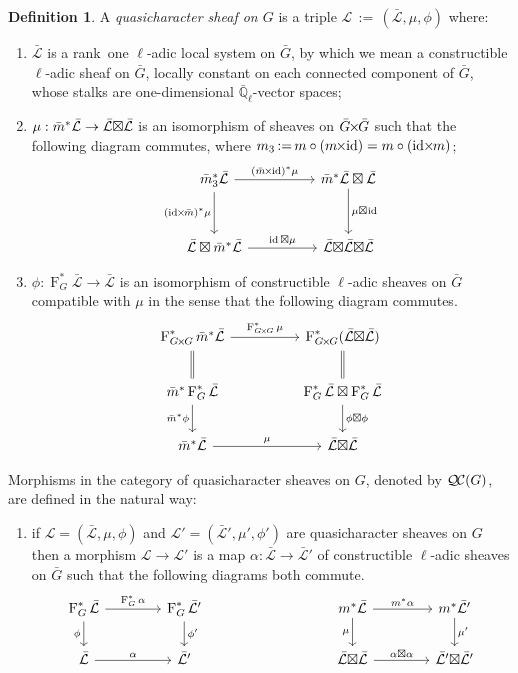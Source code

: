 \documentclass[11pt]{amsart}
\makeatletter
\theoremstyle{plain}
\theoremstyle{definition}
\newtheorem{definition}[theorem]{Definition}
\theoremstyle{remark}
\newcommand{\EE}{\mathbb{\bar Q}_\ell}
\newcommand{\Frob}[1]{\operatorname{F}_{#1}}
\DeclareMathOperator{\id}{id}
\newcommand{\ceq}{{\, :=\, }}
\newcommand{\qcs}[1]{{\mathcal{#1}}}
\newcommand{\gqcs}[1]{{\mathcal{\bar #1}}}
\newcommand{\QC}{{\mathcal{Q\hskip-0.8pt C}}}
\newcommand{\labitem}[2]{%
\def\@itemlabel{\textbf{#1}}
\item
\def\@currentlabel{#1}\label{#2}}
\newcommand{\bm}{\bar{m}}
\newcommand{\bG}{\bar{G}}
\newcommand{\tight}[3]{\hspace{-#1pt}{#2}\hspace{-#3pt}}
\newcommand{\bGxG}{\text{$\bar{G} \tight{1}{\times}{1} \bar{G}$}}
\newcommand{\GxxG}{\text{$G \tight{1}{\times}{1} G$}}
\newcommand{\LxL}{\text{$\gqcs{L} \tight{0}{\boxtimes}{0} \gqcs{L}$}}
\makeatother
\begin{document}
\begin{definition}\label{def:QC}
A \emph{quasicharacter sheaf on $G$} is a triple
$\qcs{L}\ceq (\gqcs{L},\mu,\phi)$ where:
\begin{enumerate}
\labitem{(CS.0)}{CS.0} $\gqcs{L}$ is a rank~one $\ell$-adic local system on $\bG$, by which we mean
a constructible $\ell$-adic sheaf on $\bG$, locally constant on each connected component of $\bG$, whose stalks are one-dimensional $\EE$-vector spaces; 
\labitem{(CS.1)}{CS.1} $\mu: \bm^* \gqcs{L} \to \LxL$ is an isomorphism of sheaves on $\bGxG$ such that the following diagram commutes, 
  where $m_3 \ceq m\circ (m\tight{1}{\times}{2}\id) = m\circ (\id\tight{2}{\times}{1} m)$;
%
  \[
  \begin{tikzcd}[row sep=30]
  \bm_3^*\gqcs{L} \arrow{rr}{(\bm \tight{1}{\times}{2} \id)^*\mu} \arrow[swap]{d}{(\id \tight{2}{\times}{1} \bm)^*\mu}
    &&  \bm^*\gqcs{L} \boxtimes \gqcs{L} \dar{\mu \tight{0}{\boxtimes}{1} \id} \\
    \gqcs{L} \boxtimes \bm^* \gqcs{L} \arrow{rr}{\id \boxtimes \mu}
    &&  \gqcs{L} \tight{0}{\boxtimes}{0} \LxL
  \end{tikzcd}
  \]
%
\labitem{(CS.2)}{CS.2} $\phi : \Frob{G}^* \gqcs{L} \to \gqcs{L}$ is an
  isomorphism of constructible $\ell$-adic sheaves on $\bG$ compatible with $\mu$ in the sense that the following diagram commutes.
%
  \[
  \begin{tikzcd}[row sep=20]
  \Frob{\GxxG}^* \bm^* \gqcs{L} \arrow{rr}{\Frob{\GxxG}^*\mu}
    && \Frob{\GxxG}^*(\LxL)\\
    \arrow[equal]{u} \bm^*  \Frob{G}^* \gqcs{L} \arrow[swap]{d}{\bm^* \phi}
    && \Frob{G}^*\gqcs{L}\boxtimes \Frob{G}^*\gqcs{L} \dar{\phi\boxtimes \phi} \arrow[equal]{u} \\
    \bm^*\gqcs{L} \arrow{rr}{\mu}
    && \LxL
  \end{tikzcd}
  \]
\end{enumerate}
\end{definition}

Morphisms in the category of quasicharacter sheaves on $G$, denoted by $\QC(G)$, are defined in the natural way:
\begin{enumerate}
\labitem{(CS.3)}{CS.3} if $\qcs{L} = (\gqcs{L},\mu,\phi)$ and
  $\qcs{L'} = (\gqcs{L'},\mu',\phi')$ are quasicharacter sheaves on $G$ then
  a morphism $\qcs{L} \to \qcs{L}'$ is a map $\alpha : \gqcs{L} \to \gqcs{L'}$
  of constructible $\ell$-adic sheaves on $\bG$ such that the following diagrams both commute.
  \[
  \begin{tikzcd}[column sep=40]
  \Frob{G}^* \gqcs{L} \rar{\Frob{G}^* \alpha} \arrow[swap]{d}{\phi} & \Frob{G}^* \gqcs{L'} \dar{\phi'}
  & %
  & \arrow[swap]{d}{\mu} m^* \gqcs{L} \rar{m^* \alpha} & m^* \gqcs{L'} \dar{\mu'} \\
  \gqcs{L} \rar{\alpha} & \gqcs{L'}
  & {} & \LxL \rar{\tight{1}{\alpha\boxtimes \alpha}{1}} & \gqcs{L'} \tight{0}{\boxtimes}{0} \gqcs{L'}
  \end{tikzcd}
  \]
\end{enumerate}
\end{document}
